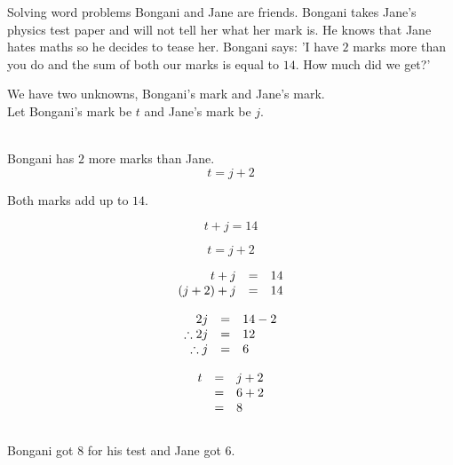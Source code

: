 \begin{wex}{Solving word problems}{
Bongani and Jane are friends. Bongani takes Jane's physics test paper and will not tell her what her mark is. 
He knows that Jane hates maths so he decides to tease her. Bongani says: 'I have $2$ marks more than you do and the sum of both our marks is equal to $14$. 
How much did we get?'}
{
We have two unknowns, Bongani's mark and
 Jane's mark. 
\\Let Bongani's mark be $t$ and Jane's mark be $j$. 

\\Bongani has $2$ more marks than Jane.
\begin{equation*}
t=j+2
\end{equation*}

Both marks add up to $14$.

\begin{equation*}
t+j=14
\end{equation*}

\begin{equation*}
t=j+2
\end{equation*}

\begin{equation*}
    \begin{array}{ccc}\hfill t+j& =& 14\hfill \\
	\hfill (j+2)+j& =& 14\hfill \\

    \end{array}
\end{equation*}

\begin{equation*}
    \begin{array}{ccl}\hfill 2j& =& 14 - 2\hfill \\
	\hfill \therefore 2j& =& 12\hfill \\
\hfill \therefore j &=& 6 \hfill

    \end{array}
\end{equation*}

\begin{equation*}
\begin{array}{ccl}\hfill t& =& j+2\hfill \\ & =& 6+2\hfill \\ & =& 8\hfill \end{array}
\end{equation*}
\\
Bongani got $8$ for his test and Jane got  $6$.\\
}
\end{wex}


